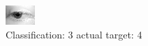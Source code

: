 \begin{figure}[h!]
\begin{center}
\includegraphics[width=0.60\columnwidth]{figures/ID2555_class_3_target_4.png}
\end{center}
\caption{ Classification: 3 actual target: 4}
\label{fig:ID2555_class_3_target_4}
\end{figure}
